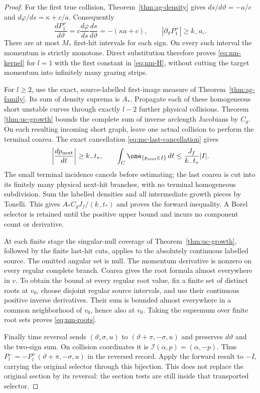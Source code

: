\begin{proof}
For the first true collision, Theorem~\ref{thm:ag-density} gives
$ds/d\vartheta=-a/c$ and $d\varphi/ds=\kappa+c/a$.
Consequently
\[
 \frac{dP_1^+}{d\vartheta}
       =c\frac{d\varphi}{ds}\frac{ds}{d\vartheta}
       =-(\kappa a+c),\qquad
 |\partial_\vartheta P_1^+|\ge k_-a_\circ.
\]
There are at most $M_*$ first-hit intervals for each sign.  On every
such interval the momentum is strictly monotone.  Direct substitution
therefore proves \eqref{eq:nm-kernel} for $l=1$ with the first
constant in \eqref{eq:nm-H}, without cutting the target momentum
into infinitely many grazing strips.

For $l\ge2$, use the exact, source-labelled first-image measure
of Theorem~\ref{thm:ag-family}.  Its sum of density suprema is
$A_*$.  Propagate each of these homogeneous short unstable curves
through exactly $l-2$ further physical collisions.  Theorem~
\ref{thm:uc-growth} bounds the complete sum of inverse arclength
Jacobians by $C_g$.  On each resulting incoming short graph, leave
one actual collision to perform the terminal coarea.  The exact
cancellation \eqref{eq:mc-last-cancellation} gives
\[
 \left|\frac{dp_{\rm next}}{d\ell}\right|\ge k_-t_*,
 \qquad
 \int_C\one_{\{p_{\rm next}\in I\}}\,d\ell
                   \le\frac{J_f}{k_-t_*}|I|.
\]
The small terminal incidence cancels before estimating; the last
coarea is cut into its finitely many physical next-hit branches,
with no terminal homogeneous subdivision.  Sum the labelled
densities and all intermediate growth pieces by Tonelli.  This gives
$A_*C_gJ_f/(k_-t_*)$ and proves the forward inequality.  A Borel
selector is retained until the positive upper bound and incurs no
component count or derivative.

At each finite stage the singular-null coverage of
Theorem~\ref{thm:uc-growth}, followed by the finite last-hit cuts,
applies to the absolutely continuous labelled source.  The omitted
angular set is null.  The momentum derivative is nonzero on every
regular complete branch.  Coarea gives the root formula almost
everywhere in $v$.  To obtain the bound at every regular root value,
fix a finite set of distinct roots at $v_0$, choose disjoint regular
source intervals, and use their continuous positive inverse
derivatives.  Their sum is bounded almost everywhere in a common
neighborhood of $v_0$, hence also at $v_0$.  Taking the supremum
over finite root sets proves \eqref{eq:nm-roots}.

Finally time reversal sends
$(\vartheta,\sigma,u)$ to $(\vartheta+\pi,-\sigma,u)$ and
preserves $d\vartheta$ and the two-sign sum.  On collision
coordinates it is $\mathcal I(\alpha,p)=(\alpha,-p)$.
Thus $P_l^-=-P_l^+(\vartheta+\pi,-\sigma,u)$ in the reversed
record.  Apply the forward result to $-I$, carrying the original
selector through this bijection.  This does not replace the
original section by its reversal: the section tests are still
inside that transported selector.
\end{proof}

